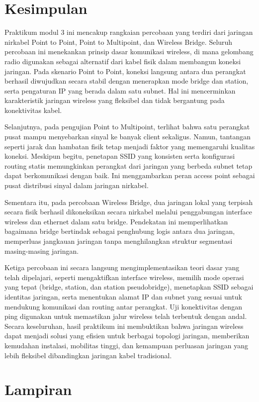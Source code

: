 \section{Kesimpulan}
Praktikum modul 3 ini mencakup rangkaian percobaan yang terdiri dari jaringan nirkabel Point to Point, Point to Multipoint, dan Wireless Bridge. Seluruh percobaan ini menekankan prinsip dasar komunikasi wireless, di mana gelombang radio digunakan sebagai alternatif dari kabel fisik dalam membangun koneksi jaringan. Pada skenario Point to Point, koneksi langsung antara dua perangkat berhasil diwujudkan secara stabil dengan menerapkan mode bridge dan station, serta pengaturan IP yang berada dalam satu subnet. Hal ini mencerminkan karakteristik jaringan wireless yang fleksibel dan tidak bergantung pada konektivitas kabel.

Selanjutnya, pada pengujian Point to Multipoint, terlihat bahwa satu perangkat pusat mampu menyebarkan sinyal ke banyak client sekaligus. Namun, tantangan seperti jarak dan hambatan fisik tetap menjadi faktor yang memengaruhi kualitas koneksi. Meskipun begitu, penetapan SSID yang konsisten serta konfigurasi routing statis memungkinkan perangkat dari jaringan yang berbeda subnet tetap dapat berkomunikasi dengan baik. Ini menggambarkan peran access point sebagai pusat distribusi sinyal dalam jaringan nirkabel.

Sementara itu, pada percobaan Wireless Bridge, dua jaringan lokal yang terpisah secara fisik berhasil dikoneksikan secara nirkabel melalui penggabungan interface wireless dan ethernet dalam satu bridge. Pendekatan ini memperlihatkan bagaimana bridge bertindak sebagai penghubung logis antara dua jaringan, memperluas jangkauan jaringan tanpa menghilangkan struktur segmentasi masing-masing jaringan.

Ketiga percobaan ini secara langsung mengimplementasikan teori dasar yang telah dipelajari, seperti mengaktifkan interface wireless, memilih mode operasi yang tepat (bridge, station, dan station pseudobridge), menetapkan SSID sebagai identitas jaringan, serta menentukan alamat IP dan subnet yang sesuai untuk mendukung komunikasi dan routing antar perangkat. Uji konektivitas dengan ping digunakan untuk memastikan jalur wireless telah terbentuk dengan andal. Secara keseluruhan, hasil praktikum ini membuktikan bahwa jaringan wireless dapat menjadi solusi yang efisien untuk berbagai topologi jaringan, memberikan kemudahan instalasi, mobilitas tinggi, dan kemampuan perluasan jaringan yang lebih fleksibel dibandingkan jaringan kabel tradisional.
\section{Lampiran}
